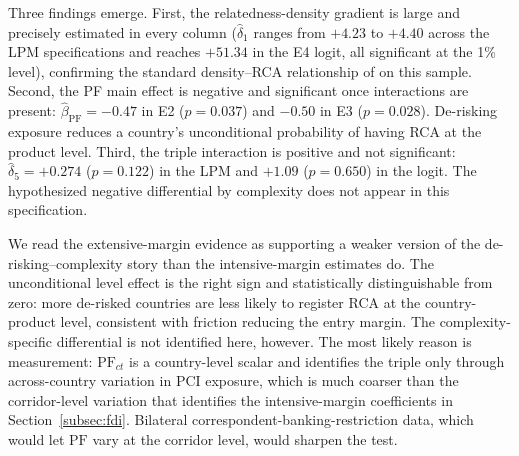 \begin{table}[htbp]
\centering
\caption{Extensive Margin: Density, Complexity, and Country-Level De-risking Exposure}
\label{tab:extensive_panel}
\begin{threeparttable}
\small

\begin{tablenotes}
\end{tablenotes}
\end{threeparttable}
\end{table}

Three findings emerge. First, the relatedness-density gradient is large and precisely estimated in every column ($\hat{\delta}_1$ ranges from $+4.23$ to $+4.40$ across the LPM specifications and reaches $+51.34$ in the E4 logit, all significant at the 1\% level), confirming the standard density--RCA relationship of \citet{Hidalgo2007_product_space} on this sample. Second, the PF main effect is negative and significant once interactions are present: $\hat{\beta}_{\text{PF}} = -0.47$ in E2 ($p = 0.037$) and $-0.50$ in E3 ($p = 0.028$). De-risking exposure reduces a country's unconditional probability of having RCA at the product level. Third, the triple interaction is positive and not significant: $\hat{\delta}_5 = +0.274$ ($p = 0.122$) in the LPM and $+1.09$ ($p = 0.650$) in the logit. The hypothesized negative differential by complexity does not appear in this specification.

We read the extensive-margin evidence as supporting a weaker version of the de-risking--complexity story than the intensive-margin estimates do. The unconditional level effect is the right sign and statistically distinguishable from zero: more de-risked countries are less likely to register RCA at the country-product level, consistent with friction reducing the entry margin. The complexity-specific differential is not identified here, however. The most likely reason is measurement: $\text{PF}_{ct}$ is a country-level scalar and identifies the triple only through across-country variation in PCI exposure, which is much coarser than the corridor-level variation that identifies the intensive-margin coefficients in Section~\ref{subsec:fdi}. Bilateral correspondent-banking-restriction data, which would let $\text{PF}$ vary at the corridor level, would sharpen the test.

